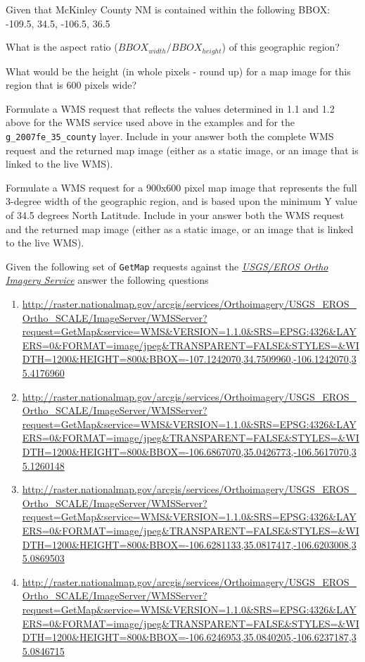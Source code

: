 \documentclass[]{book}
\providecommand{\tightlist}{%
  \setlength{\itemsep}{0pt}\setlength{\parskip}{0pt}}
\begin{document}
Given that McKinley County NM is contained within the following BBOX:
-109.5, 34.5, -106.5, 36.5

\begin{description}
\tightlist
\item[Question 1]
What is the aspect ratio (\(BBOX_{width}/BBOX_{height}\)) of this
geographic region?
\item[Question 2]
What would be the height (in whole pixels - round up) for a map image
for this region that is 600 pixels wide?
\item[Question 3]
Formulate a WMS request that reflects the values determined in 1.1 and
1.2 above for the WMS service used above in the examples and for the
\texttt{g\_2007fe\_35\_county} layer. Include in your answer both the
complete WMS request and the returned map image (either as a static
image, or an image that is linked to the live WMS).
\item[Question 4]
Formulate a WMS request for a 900x600 pixel map image that represents
the full 3-degree width of the geographic region, and is based upon the
minimum Y value of 34.5 degrees North Latitude. Include in your answer
both the WMS request and the returned map image (either as a static
image, or an image that is linked to the live WMS).
\end{description}

Given the following set of \texttt{GetMap} requests against the
\emph{\href{http://raster.nationalmap.gov/arcgis/rest/services/Orthoimagery/USGS_EROS_Ortho_SCALE/ImageServer}{USGS/EROS
Ortho Imagery Service}} answer the following questions

\begin{enumerate}
\def\labelenumi{\arabic{enumi})}
\item
  \url{http://raster.nationalmap.gov/arcgis/services/Orthoimagery/USGS_EROS_Ortho_SCALE/ImageServer/WMSServer?request=GetMap\&service=WMS\&VERSION=1.1.0\&SRS=EPSG:4326\&LAYERS=0\&FORMAT=image/jpeg\&TRANSPARENT=FALSE\&STYLES=\&WIDTH=1200\&HEIGHT=800\&BBOX=-107.1242070,34.7509960,-106.1242070,35.4176960}
\item
  \url{http://raster.nationalmap.gov/arcgis/services/Orthoimagery/USGS_EROS_Ortho_SCALE/ImageServer/WMSServer?request=GetMap\&service=WMS\&VERSION=1.1.0\&SRS=EPSG:4326\&LAYERS=0\&FORMAT=image/jpeg\&TRANSPARENT=FALSE\&STYLES=\&WIDTH=1200\&HEIGHT=800\&BBOX=-106.6867070,35.0426773,-106.5617070,35.1260148}
\item
  \url{http://raster.nationalmap.gov/arcgis/services/Orthoimagery/USGS_EROS_Ortho_SCALE/ImageServer/WMSServer?request=GetMap\&service=WMS\&VERSION=1.1.0\&SRS=EPSG:4326\&LAYERS=0\&FORMAT=image/jpeg\&TRANSPARENT=FALSE\&STYLES=\&WIDTH=1200\&HEIGHT=800\&BBOX=-106.6281133,35.0817417,-106.6203008,35.0869503}
\item
  \url{http://raster.nationalmap.gov/arcgis/services/Orthoimagery/USGS_EROS_Ortho_SCALE/ImageServer/WMSServer?request=GetMap\&service=WMS\&VERSION=1.1.0\&SRS=EPSG:4326\&LAYERS=0\&FORMAT=image/jpeg\&TRANSPARENT=FALSE\&STYLES=\&WIDTH=1200\&HEIGHT=800\&BBOX=-106.6246953,35.0840205,-106.6237187,35.0846715}
\end{enumerate}
\end{document}
